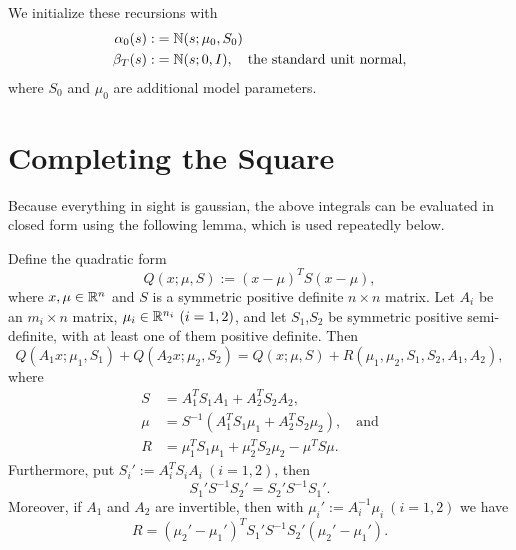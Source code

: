 \documentclass[12pt,leqno]{article}
\begin{document}
We initialize these recursions with
\begin{align*}
\alpha_0(s) :&= {\mathbb N}(s;\mu_0,S_0) \\
\beta_{T}(s) :&= {\mathbb N}(s;0,I), \quad\text{the standard unit normal},
\end{align*}
where $S_0$ and $\mu_0$ are additional model parameters.

\section{Completing the Square} 
Because everything in sight is gaussian, the above integrals can be evaluated in closed form
using the following lemma, which is used repeatedly below.
\begin{Lem}
 Define the quadratic form
  $$
 Q(x;\mu,S) := (x-\mu)^TS(x-\mu),
  $$
  where $x,\mu\in {\mathbb R}^n$ and  $S$ is a symmetric positive definite $n\times{n}$
  matrix. Let $A_i$ be an $m_i\times{n}$ matrix, $\mu_i\in{\mathbb R}^{n_i} ~ (i = 1,2)$,
  and let $S_1$,$S_2$ be symmetric positive semi-definite, with at least one of them
  positive definite.  Then 
\begin{equation}\label{comp_sq:1}
  Q(A_1x;\mu_1,S_1)+Q(A_2x;\mu_2,S_2) = Q(x;\mu,S) + R(\mu_1,\mu_2,S_1,S_2,A_1,A_2),
\end{equation}
where 
\begin{align}
S &= A_1^TS_1A_1 + A_2^TS_2A_2, \label{sigma}\\
\mu &= S^{-1}(A_1^TS_1\mu_1 + A_2^TS_2\mu_2),\quad\text{and}\label{mu}\\
R &= \mu_1^TS_1\mu_1 + \mu_2^TS_2\mu_2 - \mu^TS\mu. \label{R_def} 
\end{align}
Furthermore, put $S_i' := A_i^TS_iA_i ~ (i = 1,2)$, then
\begin{equation}\label{comp_sq:3}
  S_1'S^{-1}S_2' = S_2'S^{-1}S_1'.
\end{equation}
Moreover, if $A_1$ and $A_2$ are invertible, then with $\mu_i' := A_i^{-1}\mu_i ~ (i = 1,2)$ we have
\begin{equation}\label{comp_sq:R}
R = (\mu_2'-\mu_1')^TS_1'S^{-1}S_2'(\mu_2'-\mu_1').
\end{equation}
\end{Lem}
\end{document}
